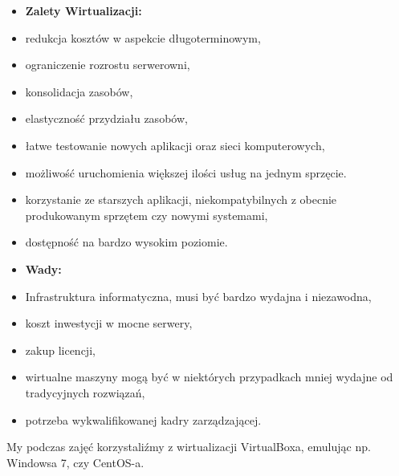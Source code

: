 \begin{itemize}
	\setlength\itemsep{1pt}
	\item[] \textbf{Zalety Wirtualizacji: }
	\item redukcja kosztów w aspekcie długoterminowym,
	\item ograniczenie rozrostu serwerowni,
	\item konsolidacja zasobów,
	\item elastyczność przydziału zasobów,
	\item łatwe testowanie nowych aplikacji oraz sieci komputerowych,
	\item możliwość uruchomienia większej ilości usług na jednym sprzęcie.
	\item korzystanie ze starszych aplikacji, niekompatybilnych z obecnie produkowanym sprzętem czy nowymi systemami,
	\item dostępność na bardzo wysokim poziomie.
\end{itemize}
	
\begin{itemize}
	\setlength\itemsep{1pt}
	\item[] \textbf{Wady: }
	\item Infrastruktura informatyczna, musi być bardzo wydajna i niezawodna,
	\item koszt inwestycji w mocne serwery,
	\item zakup licencji,
	\item wirtualne maszyny mogą być w niektórych przypadkach mniej wydajne od tradycyjnych rozwiązań,
	\item potrzeba wykwalifikowanej kadry zarządzającej.
\end{itemize}
	
My podczas zajęć korzystaliźmy z wirtualizacji VirtualBoxa, emulując np. Windowsa 7, czy CentOS-a.

